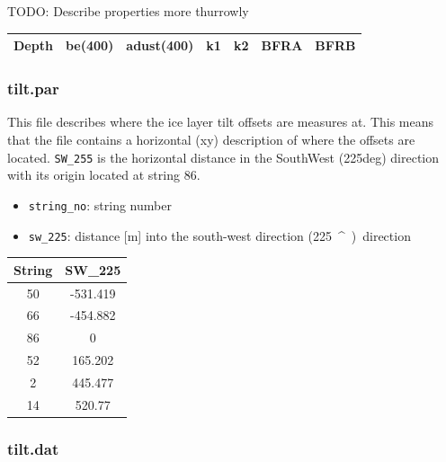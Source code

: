 \documentclass[a4paper,10pt]{scrartcl}
\begin{document}
TODO: Describe properties more thurrowly

\begin{center}
    \begin{tabular}{ |c||c|c|c|c|c|c| }
        \hline
        Depth & be(400) & adust(400) & k1 & k2 & BFRA & BFRB \\
        \hline
    \end{tabular}
\end{center}


\subsubsection*{tilt.par}

This file describes where the ice layer tilt offsets are measures at.
This means that the file contains a horizontal (xy) description of where the offsets are located.
\texttt{SW\_255} is the horizontal distance in the SouthWest (225deg) direction with its origin located at string 86.


\begin{itemize}
    \item \texttt{string\_no}: string number
    \item \texttt{sw\_225}: distance [m] into the south-west direction (\SI{225}{^\circ}) direction
\end{itemize}

\begin{center}
    \begin{tabular}{ |c|c| }
        \hline
        String & SW\_225  \\
        \hline
        50     & -531.419 \\
        66     & -454.882 \\
        86     & 0        \\
        52     & 165.202  \\
        2      & 445.477  \\
        14     & 520.77   \\
        \hline
    \end{tabular}
\end{center}

\subsubsection*{tilt.dat}
\end{document}
